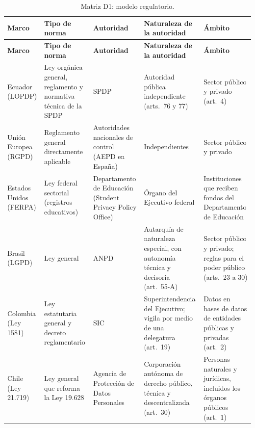 {\scriptsize
\renewcommand{\arraystretch}{1.12}
\begin{xltabular}{\textwidth}{|>{\raggedright\arraybackslash}p{2.0cm}|L|L|L|L|}
  \caption{Matriz D1: modelo regulatorio.}
  \label{tab:matriz_d1} \\
  \hline
  \textbf{Marco} & \textbf{Tipo de norma} & \textbf{Autoridad} & \textbf{Naturaleza de la autoridad} & \textbf{Ámbito} \\
  \hline
  \endfirsthead
  \hline
  \textbf{Marco} & \textbf{Tipo de norma} & \textbf{Autoridad} & \textbf{Naturaleza de la autoridad} & \textbf{Ámbito} \\
  \hline
  \endhead
  \hline
  \endlastfoot
  Ecuador (LOPDP) & Ley orgánica general, reglamento y normativa técnica de la SPDP \cite{lopdp2021,rlopdp2023} & SPDP & Autoridad pública independiente (arts.~76 y 77) & Sector público y privado (art.~4) \\ \hline
  Unión Europea (RGPD) & Reglamento general directamente aplicable \cite{rgpd2016} & Autoridades nacionales de control (AEPD en España) & Independientes & Sector público y privado \\ \hline
  Estados Unidos (FERPA) & Ley federal sectorial (registros educativos) \cite{ferpa1974} & Departamento de Educación (Student Privacy Policy Office) \cite{crs2021ferpa} & Órgano del Ejecutivo federal & Instituciones que reciben fondos del Departamento de Educación \\ \hline
  Brasil (LGPD) & Ley general \cite{brasil2018lgpd} & ANPD & Autarquía de naturaleza especial, con autonomía técnica y decisoria (art.~55-A) & Sector público y privado; reglas para el poder público (arts.~23 a 30) \\ \hline
  Colombia (Ley 1581) & Ley estatutaria general y decreto reglamentario \cite{colombia2012ley1581,colombia2013decreto1377} & SIC & Superintendencia del Ejecutivo; vigila por medio de una delegatura (art.~19) & Datos en bases de datos de entidades públicas y privadas (art.~2) \\ \hline
  Chile (Ley 21.719) & Ley general que reforma la Ley 19.628 \cite{chile2024ley21719} & Agencia de Protección de Datos Personales & Corporación autónoma de derecho público, técnica y descentralizada (art.~30) & Personas naturales y jurídicas, incluidos los órganos públicos (art.~1) \\ \hline
\end{xltabular}
}

